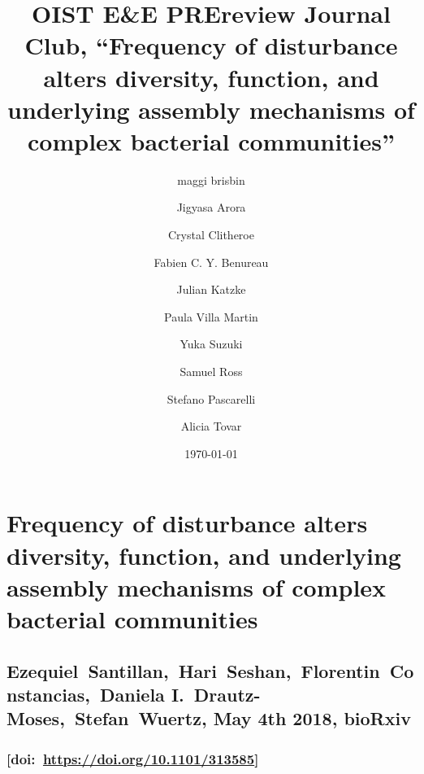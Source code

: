 \documentclass[10pt]{article}
\begin{document}
\title{OIST E\&E PREreview Journal Club, ``Frequency of disturbance alters
diversity, function, and underlying assembly mechanisms of complex
bacterial communities''}



\author[1]{maggi brisbin}%
\author[1]{Jigyasa Arora}%
\author[1]{Crystal Clitheroe}%
\author[1]{Fabien C. Y. Benureau}%
\author[1]{Julian Katzke}%
\author[1]{Paula Villa Martin}%
\author[1]{Yuka Suzuki}%
\author[1]{Samuel Ross}%
\author[1]{Stefano Pascarelli}%
\author[1]{Alicia Tovar}%
%


\vspace{-1em}



  \date{\today}


\begingroup
\let\center\flushleft
\let\endcenter\endflushleft
\maketitle
\endgroup









\section*{Frequency of disturbance alters diversity, function, and
underlying assembly mechanisms of complex bacterial
communities}

{\label{463319}}

\subsection*{Ezequiel~Santillan,~Hari~Seshan,~Florentin~Constancias,~Daniela
I.~Drautz-Moses,~Stefan~Wuertz, May 4th 2018,
bioRxiv}

{\label{720048}}

\subsubsection*{\texorpdfstring{{[}doi:~\url{https://doi.org/10.1101/313585}{]}}{{[}doi:~https://doi.org/10.1101/313585{]}}}

{\label{236037}}
\end{document}
